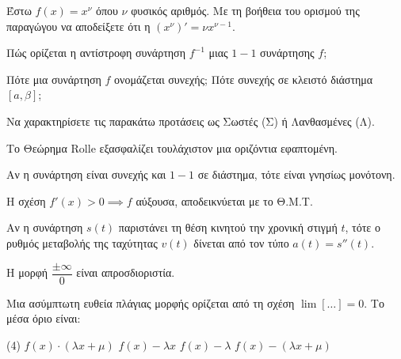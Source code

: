 \documentclass[11pt,a4paper]{article}
\newcommand{\kerkissans}[1]{{\fontfamily{maksf}\selectfont \textbf{#1}}}
\renewcommand{\textdexiakeraia}{}
\newcommand\themanum{A}
\newcounter{thema}[section]
\renewcommand{\thethema}{\arabic{thema}}
\newcommand{\Thema}{\refstepcounter{thema}{\textbf{\textcolor{black}{\faPenSquare\ \  \large \kerkissans{\textbf{\thethemaο\hspace{2mm}Διαγώνισμα - Θέμα \themanum}}}}}\hspace{0mm}}{}
\newenvironment{thema}[1]
{\begin{tcolorbox}[title=\Thema\kerkissans{\textbf{\large{  #1}}},breakable,
enhanced standard,titlerule=0pt,toprule=0pt, rightrule=0pt, bottomrule=0pt,
colback=white,left=0mm,top=1mm,bottom=0mm,
boxrule=0pt,
colframe=white,leftrule=0mm,sharp corners,coltitle=black]
\renewcommand{\themanum}{#1}}
{\end{tcolorbox}}
\newcommand{\eng}[1]{\selectlanguage{english}#1\selectlanguage{greek}}
\begin{document}
\begin{thema}{A}
\begin{erwthma}
    \item Έστω $f(x) = x^\nu$ όπου $\nu$ φυσικός αριθμός. Με τη βοήθεια του ορισμού της παραγώγου να αποδείξετε ότι η $(x^\nu)' = \nu x^{\nu - 1}$.
    \item Πώς ορίζεται η αντίστροφη συνάρτηση $f^{-1}$ μιας $1-1$ συνάρτησης $f$;
    \item Πότε μια συνάρτηση $f$ ονομάζεται συνεχής; Πότε συνεχής σε κλειστό διάστημα $[a, \beta]$;
    \item Να χαρακτηρίσετε τις παρακάτω προτάσεις ως Σωστές (Σ) ή Λανθασμένες (Λ).
    \begin{alist}
        \item Το Θεώρημα \eng{Rolle} εξασφαλίζει τουλάχιστον μια οριζόντια εφαπτομένη.
        \item Αν η συνάρτηση είναι συνεχής και $1-1$ σε διάστημα, τότε είναι γνησίως μονότονη.
        \item Η σχέση $f'(x)>0 \implies f$ αύξουσα, αποδεικνύεται με το Θ.Μ.Τ.
        \item Αν η συνάρτηση $s(t)$ παριστάνει τη θέση κινητού την χρονική στιγμή $t$, τότε ο ρυθμός μεταβολής της ταχύτητας $v(t)$ δίνεται από τον τύπο $a(t)=s''(t)$.
        \item Η μορφή $\dfrac{\pm\infty}{0}$ είναι απροσδιοριστία.
    \end{alist}
    \item Μια ασύμπτωτη ευθεία πλάγιας μορφής ορίζεται από τη σχέση $\lim\limits [\dots] = 0$. Το μέσα όριο είναι:
    \begin{tasks}[label=\let\textdexiakeraia\relax\alph*.](4)
        \task $f(x) \cdot (\lambda x + \mu)$
        \task $f(x) - \lambda x$
        \task $f(x) - \lambda$
        \task $f(x) - (\lambda x + \mu)$
    \end{tasks}
\end{erwthma}
\end{thema}
\vspace{1cm}
\end{document}
